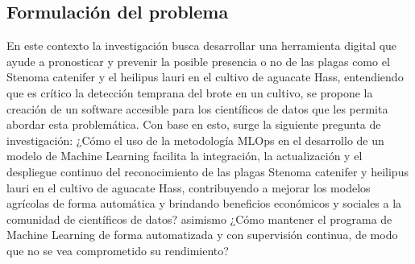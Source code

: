 \subsection{Formulación del problema}

En este contexto la investigación busca desarrollar una herramienta digital que ayude a pronosticar y prevenir la posible presencia o no de las plagas como el Stenoma catenifer y el heilipus lauri en el cultivo de aguacate Hass, entendiendo que es crítico la detección temprana del brote en un cultivo, se propone la creación de un software accesible para los científicos de datos que les permita abordar esta problemática. Con base en esto, surge la siguiente pregunta de investigación: ¿Cómo el uso de la metodología MLOps en el desarrollo de un modelo de Machine Learning facilita la integración, la actualización y el despliegue continuo del reconocimiento de las plagas Stenoma catenifer y heilipus lauri en el cultivo de aguacate Hass, contribuyendo a mejorar los modelos agrícolas de forma automática y brindando beneficios económicos y sociales a la comunidad de científicos de datos? asimismo ¿Cómo mantener el programa de Machine Learning de forma automatizada y con supervisión continua, de modo que no se vea comprometido su rendimiento?